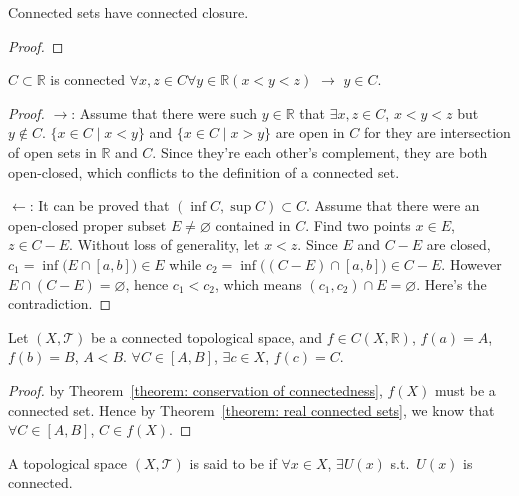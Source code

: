 \documentclass[openany]{book}
\begin{document}
\begin{theorem}\label{theorem: closure of connected set}
	Connected sets have connected closure.
\end{theorem}
\begin{proof}
\end{proof}


\begin{theorem}\label{theorem: real connected sets}
	$C \subset \mathbb R$ is connected   $\forall x, z \in C \forall y \in \mathbb R (x < y < z)$  $\to $ $y \in C$.
\end{theorem}
\begin{proof}
	$\to$:
	Assume that there were such $y \in \mathbb R$ that $\exists x, z \in C$, $x < y < z$ but $y \notin C$. 
	$\{x \in C \mid x < y\}$ and $\{x \in C \mid x > y\}$ are open in $C$ for they are intersection of open sets in $\mathbb R$ and $C$. 
	Since they're each other's complement, they are both open-closed, which conflicts to the definition of a connected set.
	
	$\gets$: 
	It can be proved that $(\inf C, \sup C) \subset C$. 
	Assume that there were an open-closed proper subset $E \neq \varnothing$ contained in $C$. 
	Find two points $x \in E$, $z \in C - E$. 
	Without loss of generality, let $x < z$. 
	Since $E$ and $C - E$ are closed, $c_1 = \inf \big( E \cap [a,b] \big) \in E$ while $c_2 = \inf \big((C - E) \cap [a, b]\big) \in C - E$. 
	However $E \cap (C - E) = \varnothing$, hence $c_1 < c_2$, which means $(c_1, c_2) \cap E = \varnothing$. 
	Here's the contradiction.
\end{proof}

\begin{theorem}%
	\label{theorem: intermediate-value}
	Let $(X, \mathscr T)$ be a connected topological space, and $f \in C(X, \mathbb R)$, $f(a) = A$, $f(b) = B$, $A < B$.
	$\forall C \in [A, B]$, $\exists c \in X$, $f(c) = C$.
\end{theorem}
\begin{proof}
	by Theorem~\ref{theorem: conservation of connectedness}, $f(X)$ must be a connected set. Hence by Theorem~\ref{theorem: real connected sets}, we know that $\forall C \in [A, B]$, $C \in f(X)$.
\end{proof}

\begin{definition}\label{definition: locally connected}
	A topological space $(X, \mathscr T)$ is said to be  if $\forall x \in X$, $\exists U(x) $ s.t.\ $U(x)$ is connected.
\end{definition}
\end{document}
